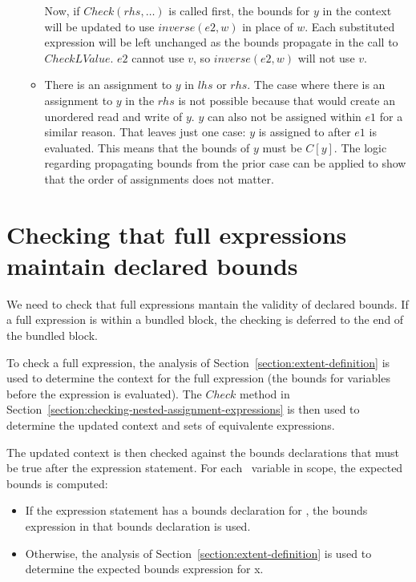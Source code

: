 \begin{itemize}
\begin{itemize}
Now, if $Check(rhs, \ldots)$ is called first, the bounds for $y$ in the context will be updated to use
$inverse(e2, w)$ in place of $w$.  Each substituted expression will be left unchanged as the bounds
propagate in the call to $CheckLValue$.  $e2$ cannot use $v$, so $inverse(e2, w)$ will not use $v$.

\item There is an assignment to $y$ in $lhs$ or $rhs$.   The case where there is an assignment 
to $y$ in the $rhs$ is not possible because that would create an unordered read and write of $y$.
$y$ can also not be assigned within $e1$ for a similar reason.  That leaves just one case: $y$ is
assigned to after $e1$ is evaluated.  This means that the bounds of $y$ must be $C[y]$.   The logic
regarding propagating bounds from the prior case can be applied to show that the order of
assignments does not matter.
\end{itemize}
\end{itemize}


\section{Checking that full expressions maintain declared bounds}
\label{section:checking-expression-statements}

We need to check that full expressions mantain the validity of
declared bounds.  If a full expression is within a
bundled block, the checking is deferred to the end of the bundled block.

To check a full expression, the analysis of 
Section~\ref{section:extent-definition} is used
to determine the context for the full expression (the bounds
for variables before the expression is evaluated). The $Check$
method in Section~\ref{section:checking-nested-assignment-expressions}
is then used to determine the updated context and sets of equivalente expressions.

The updated context is then checked against the bounds declarations that
must be true after the expression statement. For each
\arrayptr\ variable  in scope, the expected bounds is
computed:

\begin{itemize}
\item
  If the expression statement has a bounds declaration for , the
  bounds expression in that bounds declaration is used.
\item
  Otherwise, the analysis of Section~\ref{section:extent-definition}
  is used to determine the
  expected bounds expression for x.
\end{itemize}

